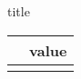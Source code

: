 {{title}}
\begin{tabular}{ | c | c |}
\hline
{%
\textbf{ {{label}}} & {{value}} \\ \hline
{%
\end{tabular}